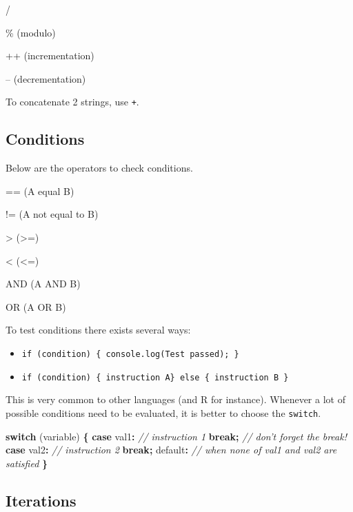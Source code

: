 \documentclass[]{book}
\newenvironment{Shaded}{\begin{snugshade}}{\end{snugshade}}
\newcommand{\CommentTok}[1]{\textcolor[rgb]{0.56,0.35,0.01}{\textit{#1}}}
\newcommand{\ControlFlowTok}[1]{\textcolor[rgb]{0.13,0.29,0.53}{\textbf{#1}}}
\newcommand{\DataTypeTok}[1]{\textcolor[rgb]{0.13,0.29,0.53}{#1}}
\newcommand{\NormalTok}[1]{#1}
\newcommand{\OperatorTok}[1]{\textcolor[rgb]{0.81,0.36,0.00}{\textbf{#1}}}
\providecommand{\tightlist}{%
  \setlength{\itemsep}{0pt}\setlength{\parskip}{0pt}}
\begin{document}
/

\% (modulo)

++ (incrementation)

-- (decrementation)

To concatenate 2 strings, use \texttt{+}.

\hypertarget{conditions}{%
\subsection{Conditions}\label{conditions}}

Below are the operators to check conditions.

== (A equal B)

!= (A not equal to B)

\textgreater{} (\textgreater{}=)

\textless{} (\textless{}=)

AND (A AND B)

OR (A OR B)

To test conditions there exists several ways:

\begin{itemize}
\tightlist
\item
  \texttt{if\ (condition)\ \{\ console.log(\textquotesingle{}Test\ passed\textquotesingle{});\ \}}
\item
  \texttt{if\ (condition)\ \{\ instruction\ A\}\ else\ \{\ instruction\ B\ \}}
\end{itemize}

This is very common to other languages (and R for instance). Whenever a lot of possible conditions need to be evaluated, it is better to choose the \texttt{switch}.

\begin{Shaded}
\begin{Highlighting}[]
\ControlFlowTok{switch}\NormalTok{ (variable) }\OperatorTok{\{}
  \ControlFlowTok{case} \DataTypeTok{val1}\OperatorTok{:} \CommentTok{// instruction 1}
  \ControlFlowTok{break}\OperatorTok{;} \CommentTok{// don't forget the break!}
  \ControlFlowTok{case} \DataTypeTok{val2}\OperatorTok{:}  \CommentTok{// instruction 2}
  \ControlFlowTok{break}\OperatorTok{;}
  \DataTypeTok{default}\OperatorTok{:} \CommentTok{// when none of val1 and val2 are satisfied}
\OperatorTok{\}}
\end{Highlighting}
\end{Shaded}

\hypertarget{iterations}{%
\subsection{Iterations}\label{iterations}}
\end{document}
